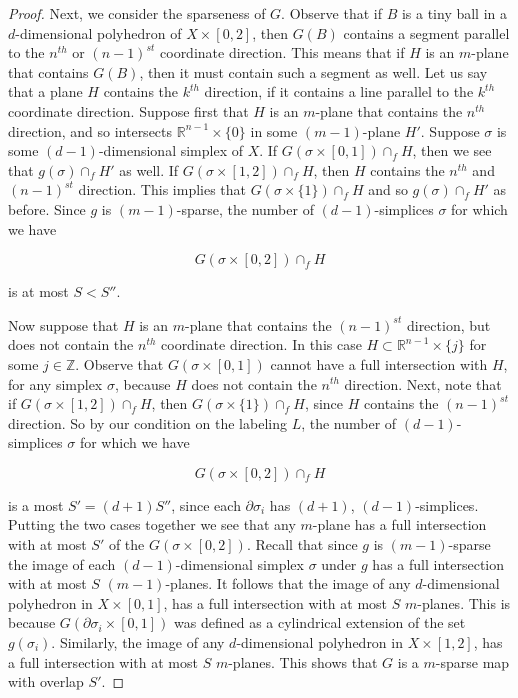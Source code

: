 \documentclass[12pt]{article}
\newcommand{\ZZ}{\mathbb{Z}}
\newcommand{\RR}{\mathbb{R}}
\begin{document}
\begin{proof}
		Next, we consider the sparseness of $G$. Observe that if $B$ is a tiny ball in a $d$-dimensional polyhedron of $X \times [0,2]$, then $G(B)$ contains a segment parallel to the $n^{th}$ or $(n-1)^{st}$ coordinate direction. This means that if $H$ is an $m$-plane that contains $G(B)$, then it must contain such a segment as well. Let us say that a plane $H$ contains the $k^{th}$ direction, if it contains a line parallel to the $k^{th}$ coordinate direction. Suppose first that $H$ is an $m$-plane that contains the $n^{th}$ direction, and so intersects $\RR^{n-1} \times \{0\}$ in some $(m-1)$-plane $H'$. Suppose $\sigma$ is some $(d-1)$-dimensional simplex of $X$. If $G(\sigma \times [0,1]) \cap_f H$, then we see that $g(\sigma) \cap_f H'$ as well. If $G(\sigma \times [1,2]) \cap_f H$, then $H$ contains the $n^{th}$ and $(n-1)^{st}$ direction. This implies that $G(\sigma \times \{1\}) \cap_f H$ and so $g(\sigma) \cap_f H'$ as before. Since $g$ is $(m-1)$-sparse, the number of $(d-1)$-simplices $\sigma$ for which we have 
		
		$$G(\sigma \times [0,2]) \cap_f H$$
		
		\noindent is at most $S < S''$.
		
		
		Now suppose that $H$ is an $m$-plane that contains the $(n-1)^{st}$ direction, but does not contain the $n^{th}$ coordinate direction. In this case $H \subset \RR^{n-1} \times \{j\}$ for some $j \in \ZZ$. Observe that $G(\sigma \times [0,1])$ cannot have a full intersection with $H$, for any simplex $\sigma$, because $H$ does not contain the $n^{th}$ direction. Next, note that if $G(\sigma \times [1,2]) \cap_f H$, then $G(\sigma \times \{1\}) 
		\cap_f H$, since $H$ contains the $(n-1)^{st}$ direction. So by our condition on the labeling $L$, the number of $(d-1)$-simplices $\sigma$ for which we have 
		
		$$G(\sigma \times [0,2]) \cap_f H$$
		
		\noindent is a most $S'=(d+1)S''$, since each $\partial \sigma_i$ has $(d+1)$, $(d-1)$-simplices. Putting the two cases together we see that any $m$-plane has a full intersection with at most $S'$ of the $G(\sigma \times [0,2])$. Recall that since $g$ is $(m-1)$-sparse the image of each $(d-1)$-dimensional simplex $\sigma$ under $g$ has a full intersection with at most $S$ $(m-1)$-planes. It follows that the image of any $d$-dimensional polyhedron in $X \times [0,1]$, has a full intersection with at most $S$ $m$-planes. This is because $G(\partial \sigma_i \times [0,1])$ was defined as a cylindrical extension of the set $g(\sigma_i)$. Similarly, the image of any $d$-dimensional polyhedron in $X \times [1,2]$, has a full intersection with at most $S$ $m$-planes. This shows that $G$ is a $m$-sparse map with overlap $S'$. 
		

\end{proof}
\end{document}
